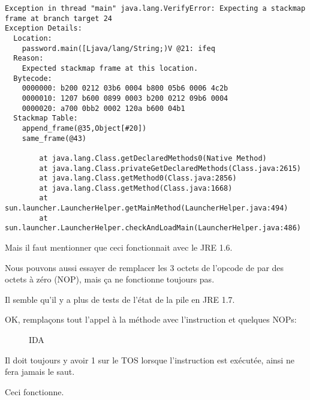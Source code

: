 \begin{lstlisting}
Exception in thread "main" java.lang.VerifyError: Expecting a stackmap frame at branch target 24
Exception Details:
  Location:
    password.main([Ljava/lang/String;)V @21: ifeq
  Reason:
    Expected stackmap frame at this location.
  Bytecode:
    0000000: b200 0212 03b6 0004 b800 05b6 0006 4c2b
    0000010: 1207 b600 0899 0003 b200 0212 09b6 0004
    0000020: a700 0bb2 0002 120a b600 04b1
  Stackmap Table:
    append_frame(@35,Object[#20])
    same_frame(@43)

        at java.lang.Class.getDeclaredMethods0(Native Method)
        at java.lang.Class.privateGetDeclaredMethods(Class.java:2615)
        at java.lang.Class.getMethod0(Class.java:2856)
        at java.lang.Class.getMethod(Class.java:1668)
        at sun.launcher.LauncherHelper.getMainMethod(LauncherHelper.java:494)
        at sun.launcher.LauncherHelper.checkAndLoadMain(LauncherHelper.java:486)
\end{lstlisting}

Mais il faut mentionner que ceci fonctionnait avec le JRE 1.6.

Nous pouvons aussi essayer de remplacer les 3 octets de l'opcode de  par
des octets à zéro (\ac{NOP}), mais ça ne fonctionne toujours pas.

Il semble qu'il y a plus de tests de l'état de la pile en JRE 1.7.

OK, remplaçons tout l'appel à la méthode  avec l'instruction 
et quelques \ac{NOP}s:

\begin{figure}[H]
\centering
{}
\caption{IDA}
\end{figure}

Il doit toujours y avoir 1 sur le \ac{TOS} lorsque l'instruction  est exécutée,
ainsi  ne fera jamais le saut.

Ceci fonctionne.
